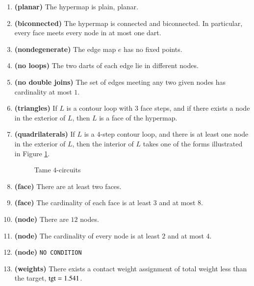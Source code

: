 \begin{enumerate}
    \item {\bf (planar)} The hypermap is plain, planar.
    \item {\bf (biconnected)} The hypermap is connected and biconnected.  In particular, every face meets every node in at most one dart.
    \item {\bf (nondegenerate)} The edge map $e$ has no fixed points.
    \item {\bf (no loops)} The two darts of each edge lie in different nodes.
    \item {\bf (no double joins)} The set of edges meeting any two given nodes has cardinality at most $1$.

    \item {\bf (triangles)} If $L$ is a contour loop with $3$ face steps, and if there exists a node in
    the exterior of $L$, then $L$ is a face of the hypermap.

    \item {\bf (quadrilaterals)} If $L$ is a $4$-step contour loop, and there is at least one node
    in the exterior of $L$, then the interior of $L$ takes one of the forms
    illustrated in Figure
    \ref{fig:fourcircuit-FT}.
    \begin{figure}[htb]
        \centering
        \caption{Tame $4$-circuits}
        \label{fig:fourcircuit-FT}
    \end{figure}
  \item {\bf (face)} There are at least two faces.
    \item {\bf (face)} The cardinality of each face is at least $3$ and at most $8$.
    \item {\bf (node)} There are $12$ nodes.
    \item {\bf (node)} The cardinality of every node is at least $2$ and at most    $4$.
    \item {\bf (node)} {\tt NO CONDITION}
    \item {\bf (weights)} There exists a contact weight assignment
        of total weight less than the target, ${\operatorname{tgt}}=1.541$.
\end{enumerate}
%

